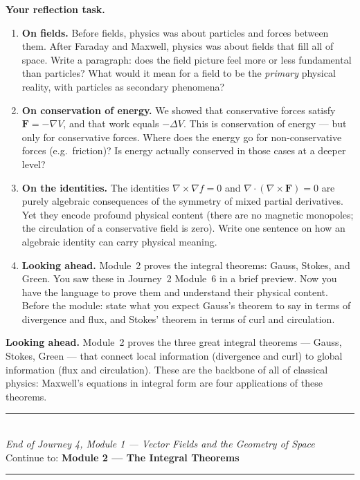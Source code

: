 \documentclass[12pt,a4paper]{article}
\begin{document}
\begin{reflectionbox}
\textbf{Your reflection task.}

\begin{enumerate}
  \item \textbf{On fields.} Before fields, physics was about particles and forces between them. After Faraday and Maxwell, physics was about fields that fill all of space. Write a paragraph: does the field picture feel more or less fundamental than particles? What would it mean for a field to be the \emph{primary} physical reality, with particles as secondary phenomena?

  \item \textbf{On conservation of energy.} We showed that conservative forces satisfy $\mathbf{F}=-\nabla V$, and that work equals $-\Delta V$. This is conservation of energy --- but only for conservative forces. Where does the energy go for non-conservative forces (e.g.\ friction)? Is energy actually conserved in those cases at a deeper level?

  \item \textbf{On the identities.} The identities $\nabla\times\nabla f=0$ and $\nabla\cdot(\nabla\times\mathbf{F})=0$ are purely algebraic consequences of the symmetry of mixed partial derivatives. Yet they encode profound physical content (there are no magnetic monopoles; the circulation of a conservative field is zero). Write one sentence on how an algebraic identity can carry physical meaning.

  \item \textbf{Looking ahead.} Module~2 proves the integral theorems: Gauss, Stokes, and Green. You saw these in Journey~2 Module~6 in a brief preview. Now you have the language to prove them and understand their physical content. Before the module: state what you expect Gauss's theorem to say in terms of divergence and flux, and Stokes' theorem in terms of curl and circulation.
\end{enumerate}
\end{reflectionbox}

\medskip
\noindent\textbf{Looking ahead.}
Module~2 proves the three great integral theorems --- Gauss, Stokes, Green --- that connect local information (divergence and curl) to global information (flux and circulation). These are the backbone of all of classical physics: Maxwell's equations in integral form are four applications of these theorems.

\vspace{1.4cm}
\begin{center}
{\color{MidBlue}\rule{0.5\linewidth}{0.8pt}}\\[6pt]
{\small\color{DarkGrey}\textit{End of Journey 4, Module 1 --- Vector Fields and the Geometry of Space}}\\[4pt]
{\small\color{DarkGrey}Continue to: \textbf{Module 2 --- The Integral Theorems}}\\[6pt]
{\color{MidBlue}\rule{0.5\linewidth}{0.8pt}}
\end{center}
\end{document}
